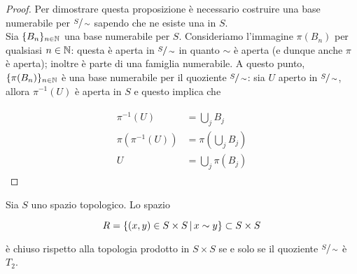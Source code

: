 \begin{proof}
	Per dimostrare questa proposizione è necessario costruire una base numerabile per $ \sfrac{S}{\sim} $ sapendo che ne esiste una in $ S $. \\
	Sia $ \{B_{n}\}_{n \in \mathbb{N}} $ una base numerabile per $ S $. Consideriamo l'immagine $ \pi(B_{n}) $ per qualsiasi $ n \in \mathbb{N} $: questa è aperta in $ \sfrac{S}{\sim} $ in quanto $ \sim $ è aperta (e dunque anche $ \pi $ è aperta); inoltre è parte di una famiglia numerabile. A questo punto, $ \{\pi(B_{n})\}_{n \in \mathbb{N}} $ è una base numerabile per il quoziente $ \sfrac{S}{\sim} $: sia $ U $ aperto in $ \sfrac{S}{\sim} $, allora $ \pi^{-1}(U) $ è aperta in $ S $ e questo implica che
	
	\begin{align}
		\begin{split}
			\pi^{-1}(U) &= \bigcup_{j} B_{j} \\
			\pi(\pi^{-1}(U)) &= \pi \left( \bigcup_{j} B_{j} \right) \\
			U &= \bigcup_{j} \pi(B_{j})
		\end{split}
	\end{align}
\end{proof}

\begin{definition}\label{prop:diag-t2}
	Sia $ S $ uno spazio topologico. Lo spazio
	
	\begin{equation}
		R = \left\{ (x,y) \in S \times S \, \middle| \, x \sim y \right\} \subset S \times S
	\end{equation}

	è chiuso rispetto alla topologia prodotto in $ S \times S $ se e solo se il quoziente $ \sfrac{S}{\sim} $ è $ T_{2} $.
\end{definition}

